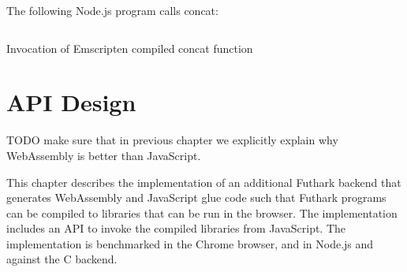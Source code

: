 \documentclass[11pt]{book}
\begin{document}
The following Node.js program calls concat:
\begin{listing}[H] 
\inputminted[fontsize=\small,baselinestretch=0.5,linenos]{C}{code/examples/emcc/hello-world.js}
\caption{Invocation of Emscripten compiled concat function }
\label{lst:hello-world.js}    
\end{listing} 
















\chapter{API Design}

TODO make sure that in previous chapter we explicitly explain why WebAssembly is better than JavaScript. 



This chapter describes the implementation of an additional Futhark backend that generates WebAssembly and JavaScript glue code such that Futhark programs can be compiled to libraries that can be run in the browser. The implementation includes an API to invoke the compiled libraries from JavaScript. The implementation is benchmarked in the Chrome browser, and in Node.js and against the C backend.
\end{document}
